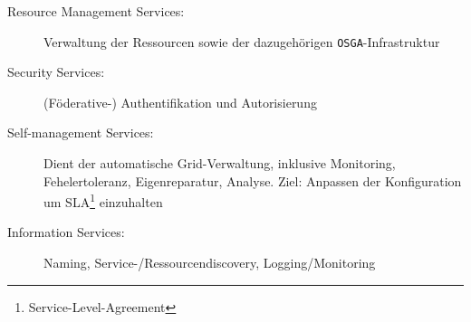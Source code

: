 \begin{itemize}
\begin{itemize}
\begin{description}
			\item[Resource Management Services:] Verwaltung der Ressourcen sowie der dazugehörigen \texttt{OSGA}-Infrastruktur
			\item[Security Services:] (Föderative-) Authentifikation und Autorisierung
			\item[Self-management Services:] Dient der automatische Grid-Verwaltung, inklusive Monitoring, Fehelertoleranz, Eigenreparatur, Analyse. Ziel: Anpassen der Konfiguration um SLA\footnote{Service-Level-Agreement} einzuhalten
			\item[Information Services:] Naming, Service-/Ressourcendiscovery, Logging/Monitoring
		\end{description}
	\end{itemize}
\end{itemize}

















